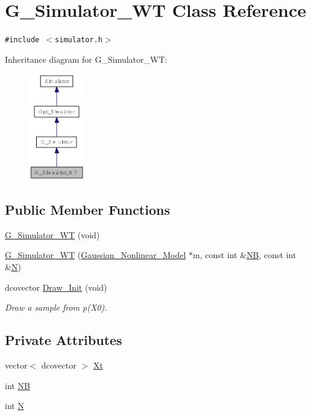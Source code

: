 \hypertarget{class_g___simulator___w_t}{
\section{G\_\-Simulator\_\-WT Class Reference}
\label{class_g___simulator___w_t}
}
{\tt \#include $<$simulator.h$>$}

Inheritance diagram for G\_\-Simulator\_\-WT:\nopagebreak
\begin{figure}[H]
\begin{center}
\leavevmode
\includegraphics[width=69pt]{class_g___simulator___w_t__inherit__graph}
\end{center}
\end{figure}
\subsection*{Public Member Functions}
\begin{CompactItemize}
\item 
\hyperlink{class_g___simulator___w_t_1d369912b29be6b65bdd0b8ef0769e71}{G\_\-Simulator\_\-WT} (void)
\item 
\hyperlink{class_g___simulator___w_t_307f1d93fda73646944844843d4b53ac}{G\_\-Simulator\_\-WT} (\hyperlink{class_gaussian___nonlinear___model}{Gaussian\_\-Nonlinear\_\-Model} $\ast$m, const int \&\hyperlink{class_g___simulator___w_t_646b6b5a2328052988746ea2e85ec2f5}{NB}, const int \&\hyperlink{class_g___simulator___w_t_8036e2d318c76440f0ed2e23dd5f5523}{N})
\item 
dcovector \hyperlink{class_g___simulator___w_t_4dab061e25ad9b7b6c279d65ea3038d2}{Draw\_\-Init} (void)
\begin{CompactList}\small\item\em Draw a sample from p(X0). \item\end{CompactList}\end{CompactItemize}
\subsection*{Private Attributes}
\begin{CompactItemize}
\item 
vector$<$ dcovector $>$ \hyperlink{class_g___simulator___w_t_74786ef68257c2af89893c9c12a0e7f2}{Xt}
\item 
int \hyperlink{class_g___simulator___w_t_646b6b5a2328052988746ea2e85ec2f5}{NB}
\item 
int \hyperlink{class_g___simulator___w_t_8036e2d318c76440f0ed2e23dd5f5523}{N}
\end{CompactItemize}


